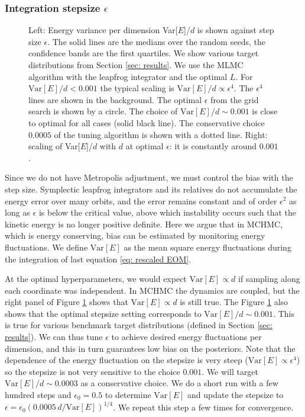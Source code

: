 \documentclass[twoside,11pt]{article}
\begin{document}
\subsubsection{Integration stepsize $\epsilon$}

\begin{figure}
    \caption{Left: Energy variance per dimension Var[$E$]/$d$ is shown against step size $\epsilon$. The solid lines are the medians over the random seeds, the confidence bands are the first quartiles. We show various target distributions from Section \ref{sec: results}. We use the MLMC algorithm with the leapfrog integrator and the optimal $L$. For $\mathrm{Var}[E]/d <0.001$ the typical scaling is $\mathrm{Var}[E]/d \propto \epsilon^4$. The $\epsilon^4$ lines are shown in the background. The optimal $\epsilon$ from the grid search is shown by a circle.
    The choice of $\mathrm{Var}[E]/ d\sim 0.001$
    is close to optimal for all cases (solid black line). The conservative choice $0.0005$ of the tuning algorithm is shown with a dotted line. Right: scaling of Var[$E$]/$d$ with $d$ at optimal $\epsilon$: it is constantly around $0.001$. }
    \label{fig:energy}
\end{figure}

Since we do 
not have Metropolis adjustment, we 
must control the bias with the 
step size. 
Symplectic leapfrog integrators
and its relatives do not 
accumulate the energy error over
many orbits, and the error 
remains constant and of order 
$\epsilon^2$ as long as $\epsilon$
is below the critical value, above 
which instability occurs such 
that the kinetic energy is 
no longer positive definite. 
Here we argue that in MCHMC, which 
is energy conserving, 
bias can be estimated
by monitoring energy fluctuations. 
We define $\mathrm{Var}[E]$ as the mean 
square energy fluctuations during the 
integration of last equation \ref{eq: rescaled EOM}.

At the optimal hyperparameters, we would expect $\text{Var}[E] \propto d$ if sampling along each coordinate was independent. In MCHMC the dynamics are coupled, but the right panel of Figure \ref{fig:energy} shows that $\text{Var}[E] \propto d$ is still true. The Figure \ref{fig:energy} also shows that the optimal stepsize setting corresponds to $\mathrm{Var}[E]/d \sim 0.001$. This is true for various benchmark target distributions (defined in Section \ref{sec: results}). We can thus tune $\epsilon$ to achieve desired energy fluctuations per dimension, and this in turn guarantees low bias on the posteriors. 
Note that the dependence of the energy fluctuation on the stepsize is very steep ($\text{Var}[E] \propto \epsilon^4$) so the stepsize is not very sensitive to the choice $0.001$. We will target $\mathrm{Var}[E]/d \sim 0.0003$ as a conservative choice. We do a short run with a few hundred steps and $\epsilon_0 = 0.5$ to determine $\mathrm{Var}[E]$ and update the stepsize to $\epsilon = \epsilon_0 (0.0005 \, d / \mathrm{Var}[E])^{1/4}$. We repeat this step a few times for convergence.
\end{document}
